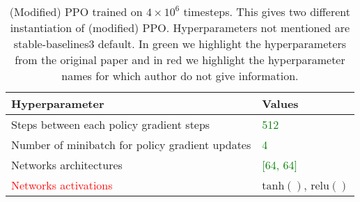 \begin{table}
    \centering
    \caption{(Modified) PPO trained on $4\times10^6$ timesteps. This gives two different instantiation of (modified) PPO. Hyperparameters not mentioned are stable-baselines3 default. In green we highlight the hyperparameters from the original paper and in red we highlight the hyperparameter names for which author do not give information.}\label{tab:ibmdp-rl2}
    \begin{tabular}{ll}
    \toprule
    \textbf{Hyperparameter} & \textbf{Values}\\
    \midrule
    Steps between each policy gradient steps & \textcolor{green}{512} \\
    Number of minibatch for policy gradient updates & \textcolor{green}{4} \\
    Networks architectures & \textcolor{green}{[64, 64]}\\
    \textcolor{red}{Networks activations} & $\operatorname{tanh()}$, $\operatorname{relu()}$\\
    \bottomrule
    \end{tabular}
    \end{table}

